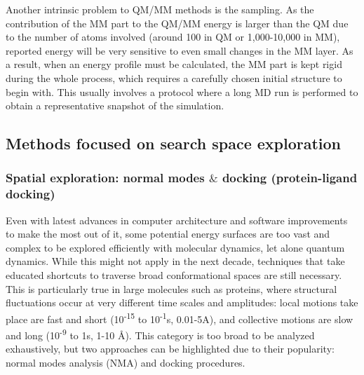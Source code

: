 Another intrinsic problem to QM/MM methods is the sampling. As the contribution of the MM part to the QM/MM energy is larger than the QM due to the number of atoms involved (around 100 in QM or 1,000-10,000 in MM), reported energy will be very sensitive to even small changes in the MM layer. As a result, when an energy profile must be calculated, the MM part is kept rigid during the whole process, which requires a carefully chosen initial structure to begin with. This usually involves a protocol where a long MD run is performed to obtain a representative snapshot of the simulation.


\subsection{Methods focused on search space exploration}
\subsubsection{Spatial exploration: normal modes $\&$  docking (protein-ligand docking)}
Even with latest advances in computer architecture and software improvements to make the most out of it, some potential energy surfaces are too vast and complex to be explored efficiently with molecular dynamics, let alone quantum dynamics. While this might not apply in the next decade, techniques that take educated shortcuts to traverse broad conformational spaces are still necessary. This is particularly true in large molecules such as proteins, where structural fluctuations occur at very different time scales and amplitudes: local motions take place are fast and short (10\textsuperscript{-15} to 10\textsuperscript{-1}s, 0.01-5A), and collective motions are slow and long (10\textsuperscript{-9} to 1s, 1-10 \AA). This category is too broad to be analyzed exhaustively, but two approaches can be highlighted due to their popularity: normal modes analysis (NMA) and docking procedures.

